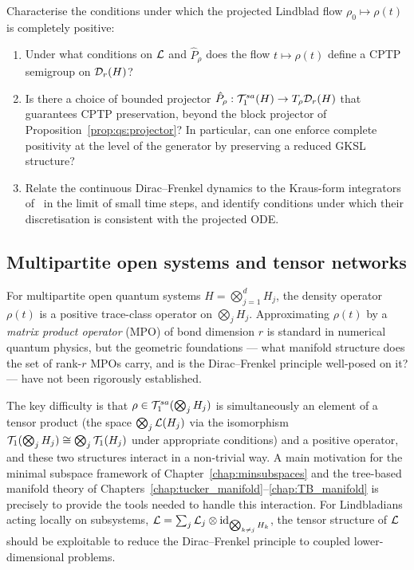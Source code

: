 \begin{problem}
\label{prob:lindblad_cptp}
Characterise the conditions under which the projected Lindblad flow
$\rho_0 \mapsto \rho(t)$ is completely positive:
\begin{enumerate}
\item[\textup{(a)}] Under what conditions on $\mathcal{L}$ and $\hat P_\rho$
    does the flow $t \mapsto \rho(t)$ define a CPTP semigroup on
    $\mathcal{D}_{r}(H)$?
\item[\textup{(b)}] Is there a choice of bounded projector
    $\hat P_\rho: \mathcal{T}_{1}^{sa}(H) \to T_\rho\mathcal{D}_{r}(H)$ that guarantees
    CPTP preservation, beyond the block projector of
    Proposition~\ref{prop:qs:projector}? In particular, can one enforce
    complete positivity at the level of the generator by preserving a
    reduced GKSL structure?
\item[\textup{(c)}] Relate the continuous Dirac--Frenkel dynamics to
    the Kraus-form integrators of~\cite{AppeloChengo2024} in the limit
    of small time steps, and identify conditions under which their
    discretisation is consistent with the projected ODE.
\end{enumerate}
\end{problem}

\subsection*{Multipartite open systems and tensor networks}

For multipartite open quantum systems $H = \bigotimes_{j=1}^d H_j$,
the density operator $\rho(t)$ is a positive trace-class operator on
$\bigotimes_j H_j$. Approximating $\rho(t)$ by a \emph{matrix product
operator} (MPO) of bond dimension $r$ is standard in numerical quantum
physics, but the geometric foundations — what manifold structure does
the set of rank-$r$ MPOs carry, and is the Dirac--Frenkel principle
well-posed on it? — have not been rigorously established.

The key difficulty is that $\rho \in \mathcal{T}_{1}^{sa}(\bigotimes_j H_j)$ is
simultaneously an element of a tensor product (the space
$\bigotimes_j \mathcal{L}(H_j)$ via the isomorphism
$\mathcal{T}_{1}(\bigotimes_j H_j) \cong \bigotimes_j \mathcal{T}_{1}(H_j)$ under
appropriate conditions) and a positive operator, and these two structures
interact in a non-trivial way. A main motivation for the minimal subspace
framework of Chapter~\ref{chap:minsubspaces} and the tree-based manifold
theory of Chapters~\ref{chap:tucker_manifold}--\ref{chap:TB_manifold}
is precisely to provide the tools needed to handle this interaction.
For Lindbladians acting locally on subsystems,
$\mathcal{L} = \sum_j \mathcal{L}_j \otimes \mathrm{id}_{\bigotimes_{k \neq j} H_k}$,
the tensor structure of $\mathcal{L}$ should be exploitable to reduce the
Dirac--Frenkel principle to coupled lower-dimensional problems.

